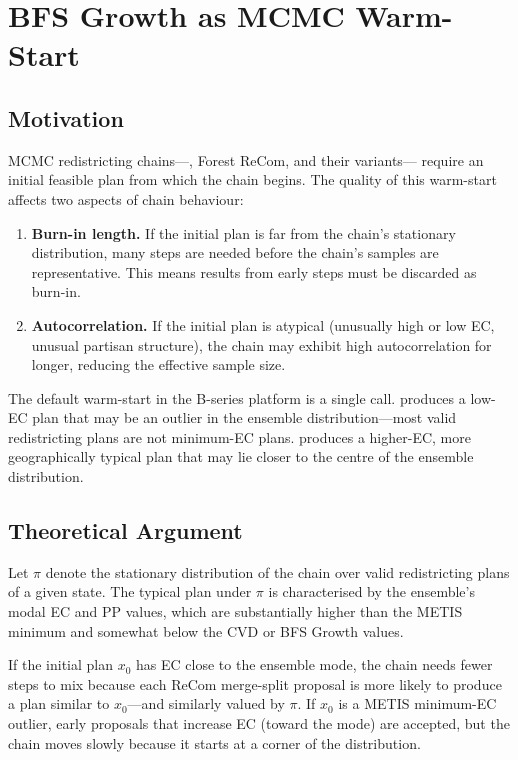 \section{BFS Growth as MCMC Warm-Start}
\label{sec:warmstart}

\subsection{Motivation}

MCMC redistricting chains---\recom{}, Forest ReCom, and their variants---
require an initial feasible plan from which the chain begins.
The quality of this warm-start affects two aspects of chain behaviour:
\begin{enumerate}
\item \textbf{Burn-in length.} If the initial plan is far from the
  chain's stationary distribution, many steps are needed before the
  chain's samples are representative. This means results from early
  steps must be discarded as burn-in.
\item \textbf{Autocorrelation.} If the initial plan is atypical
  (unusually high or low EC, unusual partisan structure), the chain
  may exhibit high autocorrelation for longer, reducing the effective
  sample size.
\end{enumerate}

The default warm-start in the B-series platform is a single \metis{} call.
\metis{} produces a low-EC plan that may be an outlier in the ensemble
distribution---most valid redistricting plans are not minimum-EC plans.
\bfsg{} produces a higher-EC, more geographically typical plan that may
lie closer to the centre of the ensemble distribution.

\subsection{Theoretical Argument}

Let $\pi$ denote the stationary distribution of the \recom{} chain over
valid redistricting plans of a given state.
The typical plan under $\pi$ is characterised by the ensemble's modal
EC and PP values, which are substantially higher than the METIS minimum
and somewhat below the CVD or BFS Growth values.

If the initial plan $x_0$ has EC close to the ensemble mode, the chain
needs fewer steps to mix because each ReCom merge-split proposal is more
likely to produce a plan similar to $x_0$---and similarly valued by $\pi$.
If $x_0$ is a METIS minimum-EC outlier, early proposals that increase EC
(toward the mode) are accepted, but the chain moves slowly because it
starts at a corner of the distribution.

